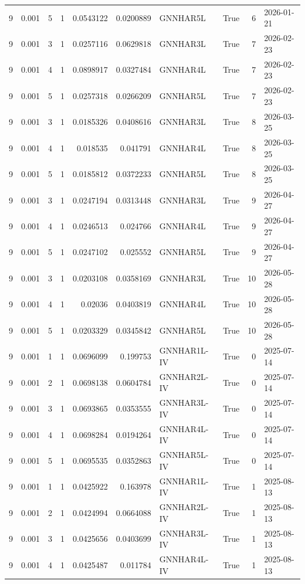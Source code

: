 \begin{tabular}{rrrrrrlrrl}
9 & 0.001 & 5 & 1 & 0.0543122 & 0.0200889 & GNNHAR5L & True & 6 & 2026-01-21 \\
9 & 0.001 & 3 & 1 & 0.0257116 & 0.0629818 & GNNHAR3L & True & 7 & 2026-02-23 \\
9 & 0.001 & 4 & 1 & 0.0898917 & 0.0327484 & GNNHAR4L & True & 7 & 2026-02-23 \\
9 & 0.001 & 5 & 1 & 0.0257318 & 0.0266209 & GNNHAR5L & True & 7 & 2026-02-23 \\
9 & 0.001 & 3 & 1 & 0.0185326 & 0.0408616 & GNNHAR3L & True & 8 & 2026-03-25 \\
9 & 0.001 & 4 & 1 & 0.018535 & 0.041791 & GNNHAR4L & True & 8 & 2026-03-25 \\
9 & 0.001 & 5 & 1 & 0.0185812 & 0.0372233 & GNNHAR5L & True & 8 & 2026-03-25 \\
9 & 0.001 & 3 & 1 & 0.0247194 & 0.0313448 & GNNHAR3L & True & 9 & 2026-04-27 \\
9 & 0.001 & 4 & 1 & 0.0246513 & 0.024766 & GNNHAR4L & True & 9 & 2026-04-27 \\
9 & 0.001 & 5 & 1 & 0.0247102 & 0.025552 & GNNHAR5L & True & 9 & 2026-04-27 \\
9 & 0.001 & 3 & 1 & 0.0203108 & 0.0358169 & GNNHAR3L & True & 10 & 2026-05-28 \\
9 & 0.001 & 4 & 1 & 0.02036 & 0.0403819 & GNNHAR4L & True & 10 & 2026-05-28 \\
9 & 0.001 & 5 & 1 & 0.0203329 & 0.0345842 & GNNHAR5L & True & 10 & 2026-05-28 \\
9 & 0.001 & 1 & 1 & 0.0696099 & 0.199753 & GNNHAR1L-IV & True & 0 & 2025-07-14 \\
9 & 0.001 & 2 & 1 & 0.0698138 & 0.0604784 & GNNHAR2L-IV & True & 0 & 2025-07-14 \\
9 & 0.001 & 3 & 1 & 0.0693865 & 0.0353555 & GNNHAR3L-IV & True & 0 & 2025-07-14 \\
9 & 0.001 & 4 & 1 & 0.0698284 & 0.0194264 & GNNHAR4L-IV & True & 0 & 2025-07-14 \\
9 & 0.001 & 5 & 1 & 0.0695535 & 0.0352863 & GNNHAR5L-IV & True & 0 & 2025-07-14 \\
9 & 0.001 & 1 & 1 & 0.0425922 & 0.163978 & GNNHAR1L-IV & True & 1 & 2025-08-13 \\
9 & 0.001 & 2 & 1 & 0.0424994 & 0.0664088 & GNNHAR2L-IV & True & 1 & 2025-08-13 \\
9 & 0.001 & 3 & 1 & 0.0425656 & 0.0403699 & GNNHAR3L-IV & True & 1 & 2025-08-13 \\
9 & 0.001 & 4 & 1 & 0.0425487 & 0.011784 & GNNHAR4L-IV & True & 1 & 2025-08-13 \\

\end{tabular}
